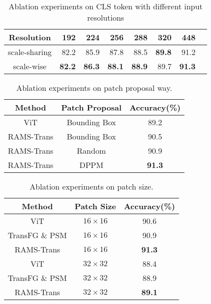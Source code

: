 \documentclass[sigconf]{acmart}
\begin{document}
\begin{table}
\caption{Ablation experiments on CLS token with different input resolutions}
\begin{center}
\begin{tabular}{c|rrrrrrr}
\hline
Resolution & 192 & 224 & 256
&288 & 320 &448\\
\hline\hline
scale-sharing & 82.2 & 85.9 & 87.8 & 88.5 & \textbf{89.8} &91.2\\
scale-wise & \textbf{82.2} & \textbf{86.3} & \textbf{88.1} & \textbf{88.9} & 89.7 &\textbf{91.3}\\
\hline
\end{tabular}
\end{center}
\label{tab_ablation}
\end{table}

\begin{table}
\caption{Ablation experiments on patch proposal way.}
\begin{center}
\begin{tabular}{c|cc}
\hline
Method & Patch Proposal & Accuracy(\%) \\
\hline\hline
ViT \cite{ViT} & Bounding Box  & 89.2 \\
RAMS-Trans & Bounding Box  & 90.5 \\
RAMS-Trans & Random & 90.9 \\
RAMS-Trans & DPPM  & \textbf{91.3} \\
\hline
\end{tabular}
\end{center}
\label{tab_ablation}
\end{table}

\begin{table}
\caption{Ablation experiments on patch size.}
\begin{center}
\begin{tabular}{c|cc}
\hline
Method & Patch Size & Accuracy(\%) \\
\hline\hline
ViT \cite{ViT} & $16  \times 16$ & 90.6 \\
TransFG \& PSM \cite{TransFG} & $16  \times 16$ & 90.9 \\
RAMS-Trans & $16  \times 16$ & \textbf{91.3} \\
\hline
ViT & $32  \times 32$  &  88.4\\
TransFG \& PSM \cite{TransFG} & $32  \times 32$  &  88.9\\
RAMS-Trans & $32 \times 32$  & \textbf{89.1} \\
\hline
\end{tabular}
\end{center}
\label{tab_ablation}
\end{table}
\end{document}
